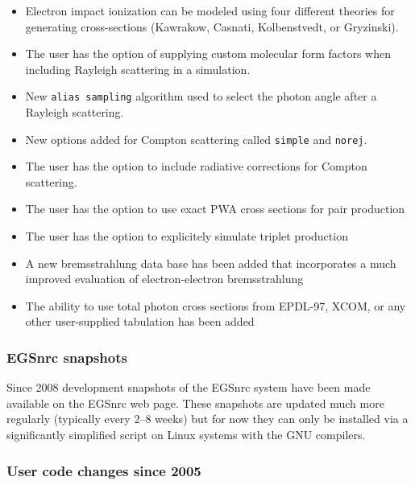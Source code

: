 \begin{itemize}

  \item Electron impact ionization can be modeled using four different theories
        for generating cross-sections (Kawrakow, Casnati, Kolbenstvedt, or
        Gryzinski).

  \item The user has the option of supplying custom molecular form factors
        when including Rayleigh scattering in a simulation.

  \item New {\tt alias sampling} algorithm used to select the 
        photon angle after a Rayleigh scattering.

  \item New options added for Compton scattering called {\tt simple} and 
        {\tt norej}.

  \item The user has the option to include radiative corrections for Compton
        scattering.

  \item The user has the option to use exact PWA cross sections for pair 
        production

  \item The user has the option to explicitely simulate triplet production

  \item A new bremsstrahlung data base has been added that incorporates a much 
        improved evaluation of electron-electron bremsstrahlung

  \item The ability to use total photon cross sections from EPDL-97, XCOM, 
        or any other user-supplied tabulation has been added


\end{itemize}

\subsubsection{ EGSnrc snapshots }

Since 2008 development snapshots of the EGSnrc system have been made 
available on the EGSnrc web page. These snapshots are updated much more 
regularly (typically every 2--8 weeks) but for now they can only be installed 
via a significantly simplified script on Linux systems with the GNU compilers. 

\subsubsection{User code changes since 2005}

